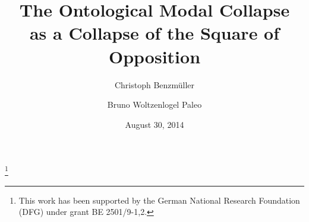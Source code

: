 \documentclass{birkmult}
\theoremstyle{definition}
\theoremstyle{remark}
\numberwithin{equation}{section}
\begin{document}
%
%
%
%
%
%
%
%
%


\title[Modal Collapse]
 {The Ontological Modal Collapse \\ 
 as a Collapse of the Square of Opposition}


\author[Benzm\"uller]{Christoph Benzm\"uller}

\address{%
Department of Mathematics and Computer Science\\
Arnimallee 7 \\
Room 115 \\
14195 Berlin \\
Germany
}



\author[Woltzenlogel-Paleo]{Bruno Woltzenlogel Paleo}
\address{ 
Favoritenstra{\ss}e 9 \\
Room HA0402 \\
1040 Wien \\
Austria
}

\thanks{This work has been supported by the German National Research Foundation (DFG) under grant BE 2501/9-1,2.}






\date{August 30, 2014}

\dedicatory{}
\end{document}
